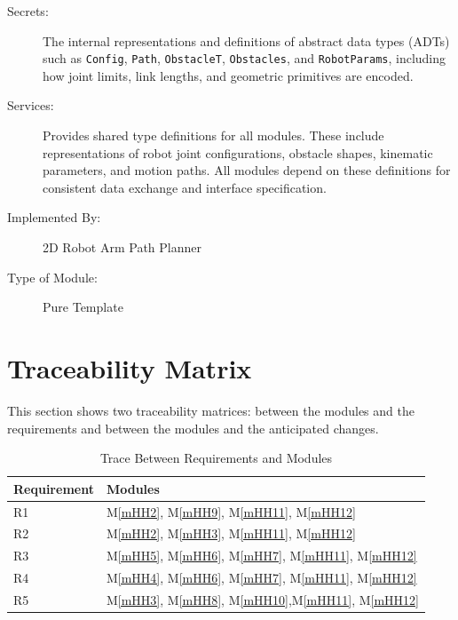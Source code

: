 \documentclass[12pt, titlepage]{article}
\newcommand{\mref}[1]{M\ref{#1}}
\begin{document}
\begin{description}
  \item[Secrets:] The internal representations and definitions of abstract data types (ADTs) such as \texttt{Config}, \texttt{Path}, \texttt{ObstacleT}, \texttt{Obstacles}, and \texttt{RobotParams}, including how joint limits, link lengths, and geometric primitives are encoded.

  \item[Services:] Provides shared type definitions for all modules. These include representations of robot joint configurations, obstacle shapes, kinematic parameters, and motion paths. All modules depend on these definitions for consistent data exchange and interface specification.

  \item[Implemented By:] 2D Robot Arm Path Planner

  \item[Type of Module:] Pure Template
\end{description}


\section{Traceability Matrix} \label{SecTM}

This section shows two traceability matrices: between the modules and the
requirements and between the modules and the anticipated changes.

\begin{table}[H]
  \centering
  \begin{tabular}{p{} p{}}
  \toprule
  \textbf{Requirement} & \textbf{Modules} \\
  \midrule
  R1 & \mref{mHH2}, \mref{mHH9}, \mref{mHH11}, \mref{mHH12} \\
  R2 & \mref{mHH2}, \mref{mHH3}, \mref{mHH11}, \mref{mHH12} \\
  R3 & \mref{mHH5}, \mref{mHH6}, \mref{mHH7}, \mref{mHH11}, \mref{mHH12} \\
  R4 & \mref{mHH4}, \mref{mHH6}, \mref{mHH7}, \mref{mHH11}, \mref{mHH12} \\
  R5 & \mref{mHH3}, \mref{mHH8}, \mref{mHH10},\mref{mHH11}, \mref{mHH12} \\
  \bottomrule
  \end{tabular}
  \caption{Trace Between Requirements and Modules}
  \label{TblRT}
  \end{table}
  
\end{document}
